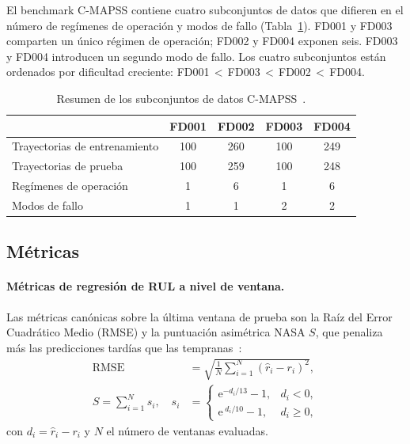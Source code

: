 \documentclass[5p,times,authoryear]{elsarticle}
\begin{document}
El benchmark C-MAPSS contiene cuatro subconjuntos de datos que difieren en el número de regímenes de operación y modos de fallo (Tabla~\ref{tab:cmapss-summary}). FD001 y FD003 comparten un único régimen de operación; FD002 y FD004 exponen seis. FD003 y FD004 introducen un segundo modo de fallo. Los cuatro subconjuntos están ordenados por dificultad creciente: FD001\,$<$\,FD003\,$<$\,FD002\,$<$\,FD004.

\begin{table}[!t]
\centering
\caption{Resumen de los subconjuntos de datos C-MAPSS~\citep{saxena2008damage}.}
\label{tab:cmapss-summary}
\begin{tabular}{lcccc}
\toprule
& FD001 & FD002 & FD003 & FD004 \\
\midrule
Trayectorias de entrenamiento & 100 & 260 & 100 & 249 \\
Trayectorias de prueba        & 100 & 259 & 100 & 248 \\
Regímenes de operación        &   1 &   6 &   1 &   6 \\
Modos de fallo                &   1 &   1 &   2 &   2 \\
\bottomrule
\end{tabular}
\end{table}

\subsection{Métricas}\label{sec:method-metrics}

\paragraph{Métricas de regresión de RUL a nivel de ventana.} Las métricas canónicas sobre la última ventana de prueba son la Raíz del Error Cuadrático Medio (RMSE) y la puntuación asimétrica NASA $S$, que penaliza más las predicciones tardías que las tempranas~\citep{saxena2008damage}:
\begin{align}
\mathrm{RMSE} &= \sqrt{\tfrac{1}{N}\sum_{i=1}^{N}(\hat r_i-r_i)^2},\label{eq:rmse}\\
S = \sum_{i=1}^{N} s_i,\quad s_i &=
\begin{cases}
\mathrm{e}^{-d_i/13}-1, & d_i<0,\\
\mathrm{e}^{\;d_i/10}-1, & d_i\ge 0,
\end{cases}\label{eq:nasa}
\end{align}
con $d_i=\hat r_i-r_i$ y $N$ el número de ventanas evaluadas.
\end{document}

